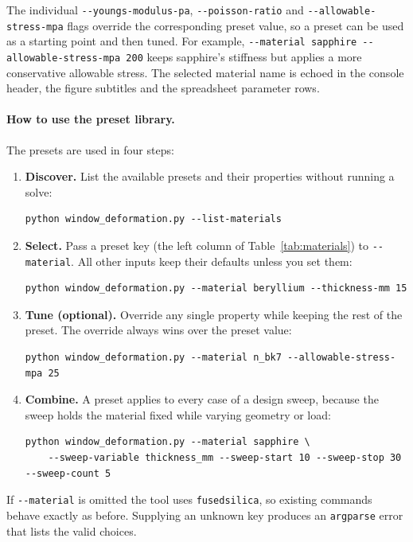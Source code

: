 \documentclass[11pt]{article}
\newcommand{\codeus}{\textunderscore\allowbreak}
\DeclareRobustCommand{\code}[1]{\texttt{\ifmmode\else\renewcommand{\_}{\codeus}\fi#1}}
\begin{document}
\noindent The individual \code{-{}-youngs-modulus-pa}, \code{-{}-poisson-ratio}
and \code{-{}-allowable-stress-mpa} flags override the corresponding preset value,
so a preset can be used as a starting point and then tuned. For example,
\code{-{}-material sapphire -{}-allowable-stress-mpa 200} keeps sapphire's stiffness
but applies a more conservative allowable stress. The selected material name is
echoed in the console header, the figure subtitles and the spreadsheet parameter
rows.

\paragraph{How to use the preset library.} The presets are used in four steps:
\begin{enumerate}[leftmargin=2em]
  \item \textbf{Discover.} List the available presets and their properties without
    running a solve:
    \begin{lstlisting}[style=shellstyle]
python window_deformation.py --list-materials
    \end{lstlisting}
  \item \textbf{Select.} Pass a preset key (the left column of
    Table~\ref{tab:materials}) to \code{-{}-material}. All other inputs keep their
    defaults unless you set them:
    \begin{lstlisting}[style=shellstyle]
python window_deformation.py --material beryllium --thickness-mm 15
    \end{lstlisting}
  \item \textbf{Tune (optional).} Override any single property while keeping the
    rest of the preset. The override always wins over the preset value:
    \begin{lstlisting}[style=shellstyle]
python window_deformation.py --material n_bk7 --allowable-stress-mpa 25
    \end{lstlisting}
  \item \textbf{Combine.} A preset applies to every case of a design sweep, because
    the sweep holds the material fixed while varying geometry or load:
    \begin{lstlisting}[style=shellstyle]
python window_deformation.py --material sapphire \
    --sweep-variable thickness_mm --sweep-start 10 --sweep-stop 30 --sweep-count 5
    \end{lstlisting}
\end{enumerate}

\noindent If \code{-{}-material} is omitted the tool uses \code{fused\_silica}, so
existing commands behave exactly as before. Supplying an unknown key produces an
\code{argparse} error that lists the valid choices.
\end{document}
